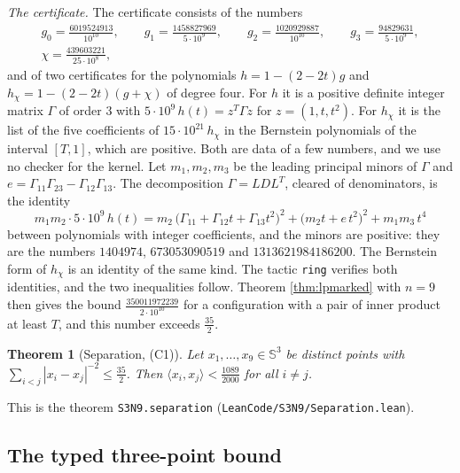 \documentclass[reqno,a4paper,11pt]{amsart}
\numberwithin{equation}{section}
\newtheorem{theorem}{Theorem}[section]
\newcommand{\Sph}{\mathbb{S}}
\newcommand{\lean}[1]{\texttt{#1}}
\newcommand{\file}[1]{\nolinkurl{#1}}
\begin{document}
\emph{The certificate.} The certificate consists of the numbers
\begin{gather*}
g_0 = \tfrac{6019524913}{10^{10}}, \qquad g_1 = \tfrac{1458827969}{5 \cdot 10^9}, \qquad g_2 = \tfrac{1020929887}{10^{10}}, \qquad g_3 = \tfrac{94829631}{5 \cdot 10^9}, \\
\chi = \tfrac{439603221}{25 \cdot 10^8},
\end{gather*}
and of two certificates for the polynomials $h = 1 - (2-2t) g$ and $h_\chi = 1 - (2-2t)(g + \chi)$ of degree four. For $h$ it is a positive definite integer matrix $\Gamma$ of order $3$ with $5 \cdot 10^9 \, h(t) = z^T \Gamma z$ for $z = (1, t, t^2)$. For $h_\chi$ it is the list of the five coefficients of $15 \cdot 10^{21} \, h_\chi$ in the Bernstein polynomials of the interval $[T, 1]$, which are positive. Both are data of a few numbers, and we use no checker for the kernel. Let $m_1, m_2, m_3$ be the leading principal minors of $\Gamma$ and $e = \Gamma_{11} \Gamma_{23} - \Gamma_{12} \Gamma_{13}$. The decomposition $\Gamma = L D L^T$, cleared of denominators, is the identity
$$
m_1 m_2 \cdot 5 \cdot 10^9 \, h(t) = m_2 \, \big(\Gamma_{11} + \Gamma_{12} t + \Gamma_{13} t^2\big)^2 + \big(m_2 t + e \, t^2\big)^2 + m_1 m_3 \, t^4
$$
between polynomials with integer coefficients, and the minors are positive: they are the numbers $1404974$, $673053090519$ and $1313621984186200$. The Bernstein form of $h_\chi$ is an identity of the same kind. The tactic \texttt{ring} verifies both identities, and the two inequalities follow. Theorem \ref{thm:lpmarked} with $n = 9$ then gives the bound $\tfrac{350011972239}{2 \cdot 10^{10}}$ for a configuration with a pair of inner product at least $T$, and this number exceeds $\tfrac{35}{2}$.

\begin{theorem}[Separation, (C1)]\label{thm:separation}
Let $x_1, \dots, x_9 \in \Sph^3$ be distinct points with $\sum_{i<j} |x_i - x_j|^{-2} \leq \tfrac{35}{2}$. Then $\langle x_i, x_j \rangle < \tfrac{1089}{2000}$ for all $i \neq j$.
\end{theorem}

This is the theorem \lean{S3N9.separation} (\file{LeanCode/S3N9/Separation.lean}).

\subsection{The typed three-point bound}\label{sec:typed}
\end{document}
